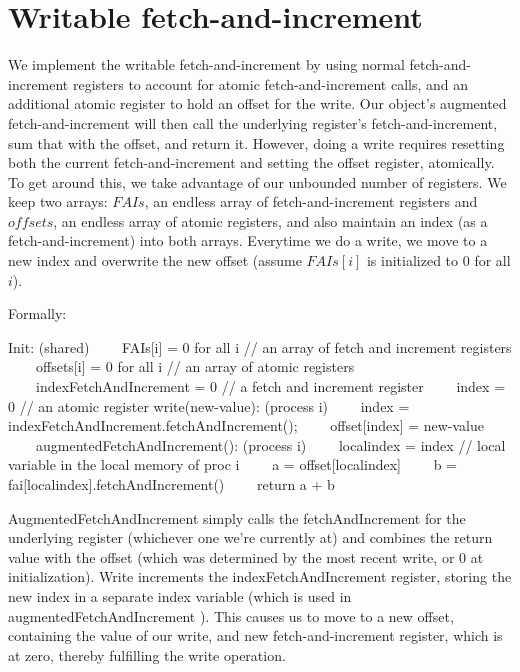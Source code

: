 \documentclass{article}
\begin{document}
\section{Writable fetch-and-increment}
We implement the writable fetch-and-increment by using normal fetch-and-increment registers to account for atomic fetch-and-increment calls, and an additional atomic register to
hold an offset for the write. Our object's augmented fetch-and-increment will then call the underlying register's fetch-and-increment, sum that with the offset, and return it. However, doing
a write requires resetting both the current fetch-and-increment and setting the offset register, atomically. To get around this, we take advantage of our unbounded number of
registers. We keep two arrays: $FAIs$, an endless array of fetch-and-increment registers and $offsets$, an endless array of atomic registers, and also maintain an index (as a
fetch-and-increment) into both arrays. Everytime we do a write, we move to a new index and overwrite the new offset (assume $FAIs[i]$ is initialized to $0$ for all $i$).

Formally:
\begin{algorithmic}
\STATE Init: (shared)
\STATE \ \ \ \ FAIs[i] = 0 for all i // an array of fetch and increment registers
\STATE \ \ \ \ offsets[i] = 0 for all i // an array of atomic registers
\STATE \ \ \ \ indexFetchAndIncrement = 0 // a fetch and increment register
\STATE \ \ \ \ index = 0 // an atomic register
\STATE
\STATE write(new-value): (process i)
\STATE \ \ \ \ index = indexFetchAndIncrement.fetchAndIncrement();
\STATE \ \ \ \ offset[index] = new-value
\STATE \ \ \ \ 
\STATE augmentedFetchAndIncrement(): (process i)
\STATE \ \ \ \ localindex = index // local variable in the local memory of proc i
\STATE \ \ \ \ a = offset[localindex]
\STATE \ \ \ \ b = fai[localindex].fetchAndIncrement()
\STATE \ \ \ \ return a + b
\end{algorithmic}

AugmentedFetchAndIncrement simply calls the fetchAndIncrement for the underlying register (whichever one we're currently at) and combines the return value with the offset (which was determined by the most recent write, or 0 at initialization). 
Write increments the indexFetchAndIncrement register, storing the new index in a separate index variable (which is used in augmentedFetchAndIncrement ). This causes us to move to a new offset, containing the value of our write, and new fetch-and-increment register, which is at zero, thereby fulfilling the write operation.
\end{document}
